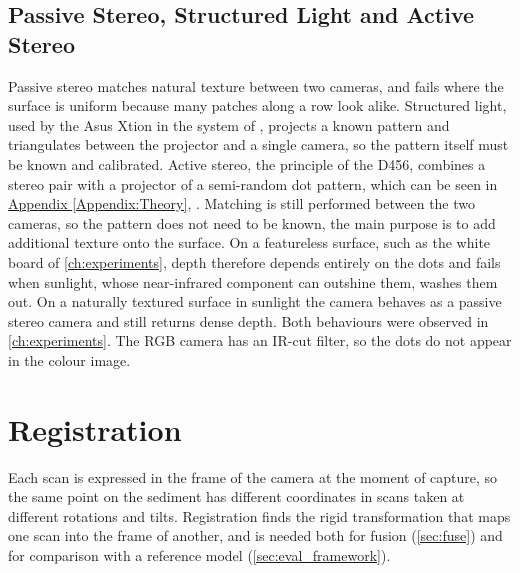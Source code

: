 \subsection{Passive Stereo, Structured Light and Active Stereo}
\label{sec:theory_active}
Passive stereo matches natural texture between two cameras, and fails where the surface is uniform because many patches along a row look alike. Structured light, used by the Asus Xtion in the system of \cite{azharRGBDFrameworkCapturing2022}, projects a known pattern and triangulates between the projector and a single camera, so the pattern itself must be known and calibrated. Active stereo, the principle of the D456, combines a stereo pair with a projector of a semi-random dot pattern, which can be seen in \hyperref[Appendix:Theory]{Appendix \ref*{Appendix:Theory}},  \cite{keselmanIntelRRealSenseTMStereoscopic2017,ProjectorsD400Series}. Matching is still performed between the two cameras, so the pattern does not need to be known, the main purpose is to add additional texture onto the surface. On a featureless surface, such as the white board of \autoref{ch:experiments}, depth therefore depends entirely on the dots and fails when sunlight, whose near-infrared component can outshine them, washes them out. On a naturally textured surface in sunlight the camera behaves as a passive stereo camera and still returns dense depth. Both behaviours were observed in \autoref{ch:experiments}. The RGB camera has an IR-cut filter, so the dots do not appear in the colour image.

\section{Registration}
\label{sec:theory_registration}
Each scan is expressed in the frame of the camera at the moment of capture, so the same point on the sediment has different coordinates in scans taken at different rotations and tilts. Registration finds the rigid transformation that maps one scan into the frame of another, and is needed both for fusion (\autoref{sec:fuse}) and for comparison with a reference model (\autoref{sec:eval_framework}).

